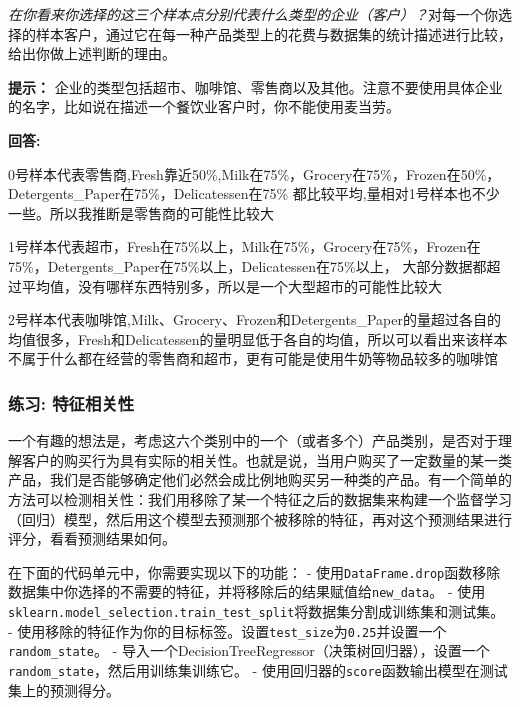 \documentclass[11pt]{article}
\begin{document}
\emph{在你看来你选择的这三个样本点分别代表什么类型的企业（客户）？}对每一个你选择的样本客户，通过它在每一种产品类型上的花费与数据集的统计描述进行比较，给出你做上述判断的理由。

\textbf{提示：}
企业的类型包括超市、咖啡馆、零售商以及其他。注意不要使用具体企业的名字，比如说在描述一个餐饮业客户时，你不能使用麦当劳。

    \textbf{回答:}

0号样本代表零售商,Fresh靠近50\%,Milk在75\%，Grocery在75\%，Frozen在50\%，Detergents\_Paper在75\%，Delicatessen在75\%
都比较平均,量相对1号样本也不少一些。所以我推断是零售商的可能性比较大

1号样本代表超市，Fresh在75\%以上，Milk在75\%，Grocery在75\%，Frozen在75\%，Detergents\_Paper在75\%以上，Delicatessen在75\%以上，
大部分数据都超过平均值，没有哪样东西特别多，所以是一个大型超市的可能性比较大

2号样本代表咖啡馆,Milk、Grocery、Frozen和Detergents\_Paper的量超过各自的均值很多，Fresh和Delicatessen的量明显低于各自的均值，所以可以看出来该样本不属于什么都在经营的零售商和超市，更有可能是使用牛奶等物品较多的咖啡馆

    \subsubsection{练习:
特征相关性}\label{ux7ec3ux4e60-ux7279ux5f81ux76f8ux5173ux6027}

一个有趣的想法是，考虑这六个类别中的一个（或者多个）产品类别，是否对于理解客户的购买行为具有实际的相关性。也就是说，当用户购买了一定数量的某一类产品，我们是否能够确定他们必然会成比例地购买另一种类的产品。有一个简单的方法可以检测相关性：我们用移除了某一个特征之后的数据集来构建一个监督学习（回归）模型，然后用这个模型去预测那个被移除的特征，再对这个预测结果进行评分，看看预测结果如何。

在下面的代码单元中，你需要实现以下的功能： -
使用\texttt{DataFrame.drop}函数移除数据集中你选择的不需要的特征，并将移除后的结果赋值给\texttt{new\_data}。
-
使用\texttt{sklearn.model\_selection.train\_test\_split}将数据集分割成训练集和测试集。
-
使用移除的特征作为你的目标标签。设置\texttt{test\_size}为\texttt{0.25}并设置一个\texttt{random\_state}。
-
导入一个DecisionTreeRegressor（决策树回归器），设置一个\texttt{random\_state}，然后用训练集训练它。
- 使用回归器的\texttt{score}函数输出模型在测试集上的预测得分。
\end{document}
